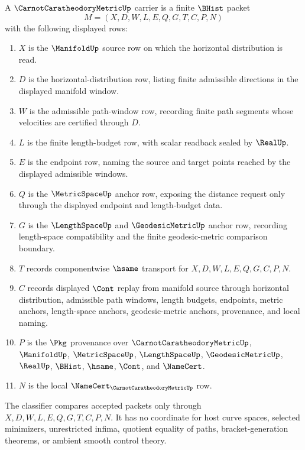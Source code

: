 \begin{definition}
\label{def:carnot-caratheodory-metric-carrier}
A $\CarnotCaratheodoryMetricUp$ carrier is a finite $\BHist$ packet
$$
M=(X,D,W,L,E,Q,G,T,C,P,N)
$$
with the following displayed rows:
\begin{enumerate}
\item $X$ is the $\ManifoldUp$ source row on which the horizontal distribution is read.
\item $D$ is the horizontal-distribution row, listing finite admissible directions in the displayed manifold window.
\item $W$ is the admissible path-window row, recording finite path segments whose velocities are certified through $D$.
\item $L$ is the finite length-budget row, with scalar readback sealed by $\RealUp$.
\item $E$ is the endpoint row, naming the source and target points reached by the displayed admissible windows.
\item $Q$ is the $\MetricSpaceUp$ anchor row, exposing the distance request only through the displayed endpoint and length-budget data.
\item $G$ is the $\LengthSpaceUp$ and $\GeodesicMetricUp$ anchor row, recording length-space compatibility and the finite geodesic-metric comparison boundary.
\item $T$ records componentwise $\hsame$ transport for $X,D,W,L,E,Q,G,C,P,N$.
\item $C$ records displayed $\Cont$ replay from manifold source through horizontal distribution, admissible path windows, length budgets, endpoints, metric anchors, length-space anchors, geodesic-metric anchors, provenance, and local naming.
\item $P$ is the $\Pkg$ provenance over $\CarnotCaratheodoryMetricUp$, $\ManifoldUp$, $\MetricSpaceUp$, $\LengthSpaceUp$, $\GeodesicMetricUp$, $\RealUp$, $\BHist$, $\hsame$, $\Cont$, and $\NameCert$.
\item $N$ is the local $\NameCert_{\CarnotCaratheodoryMetricUp}$ row.
\end{enumerate}
The classifier compares accepted packets only through $X,D,W,L,E,Q,G,T,C,P,N$. It has no coordinate for host curve spaces, selected minimizers, unrestricted infima, quotient equality of paths, bracket-generation theorems, or ambient smooth control theory.
\end{definition}

